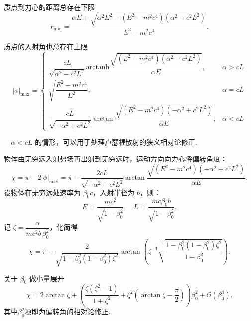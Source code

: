 质点到力心的距离总存在下限
\begin{equation*}
	r_{\text{min}} = \dfrac{\alpha E + \sqrt{\alpha^2 E^2 - (E^2 - m^2 c^4) (\alpha^2 - c^2 L^2)}}{E^2 - m^2 c^4}.
\end{equation*}

质点的入射角也总存在上限
\begin{equation*}
	|\phi|_{\text{max}} =
	\begin{cases}
		\dfrac{c L}{\sqrt{\alpha^2 - c^2 L^2}} \text{arctanh} \dfrac{\sqrt{(E^2 - m^2 c^4) (\alpha^2 - c^2 L^2)}}{\alpha E}, & \alpha > c L \\[10pt]
		\sqrt{\dfrac{E^2 - m^2 c^4}{E^2}},                                                                                   & \alpha = c L \\[10pt]
		\dfrac{c L}{\sqrt{-\alpha^2 + c^2 L^2}} \arctan \dfrac{\sqrt{(E^2 - m^2 c^4) (-\alpha^2 + c^2 L^2)}}{\alpha E},      & \alpha < c L
	\end{cases}
\end{equation*}

\begin{example}
	\(\quad\alpha < c L\) 的情形，可以用于处理卢瑟福散射的狭义相对论修正.

	物体由无穷远入射势场再出射到无穷远时，运动方向向力心将偏转角度：
	\begin{equation*}
		\chi = \pi - 2 |\phi|_{\text{max}} = \pi - \dfrac{2 c L}{\sqrt{-\alpha^2 + c^2 L^2}} \arctan \dfrac{\sqrt{(E^2 - m^2 c^4) (-\alpha^2 + c^2 L^2)}}{\alpha E}.
	\end{equation*}
	设物体在无穷远处速率为 \(\beta_0 c\)，入射半径为 \(b\)，则：
	\begin{equation*}
		E = \dfrac{m c^2}{\sqrt{1 - \beta_0^2}}, \quad
		L = \dfrac{m c \beta_0 b}{\sqrt{1 - \beta_0^2}}.
	\end{equation*}
	记 \(\zeta = \dfrac{\alpha}{m c^2 b \,\beta_0^2}\)，化简得
	\begin{equation*}
		\chi = \pi - \dfrac{2}{\sqrt{1 - \beta_0^2 (1 - \beta_0^2) \zeta^2}} \arctan \left( \zeta^{-1} \sqrt{\dfrac{1 - \beta_0^2 (1 - \beta_0^2) \zeta^2}{1 - \beta_0^2}} \right).
	\end{equation*}

	关于 \(\beta_0\) 做小量展开
	\begin{equation*}
		\chi = 2 \arctan\zeta + \left( \dfrac{\zeta (\zeta^2 - 1)}{1 + \zeta^2} + \zeta^2 \left( \arctan \zeta - \dfrac{\pi}{2} \right) \right) \beta_0^2 + \mathcal{O} (\beta_0^4).
	\end{equation*}
	其中\(\beta_0^2\)项即为偏转角的相对论修正.
\end{example}

